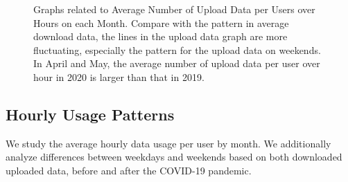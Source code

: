 \begin{figure}[t]
  \caption{Graphs related to Average Number of Upload Data per Users over Hours on each Month. Compare with the pattern in average download data, the lines in the upload data graph are more fluctuating, especially the pattern for the upload data on weekends. In April and May, the average number of upload data per user over hour in 2020 is larger than that in 2019.}
  \label{fig:upload_data_per_user_hours_fig} 
\end{figure}


  

\subsection{Hourly Usage Patterns}
We study the average hourly data usage per user by month. We additionally analyze differences between weekdays and weekends based on both downloaded uploaded data, before and after the COVID-19 pandemic. 



